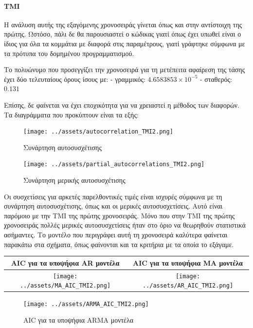\documentclass[11pt,]{article}
\let\oldparagraph\paragraph
\renewcommand{\paragraph}[1]{\oldparagraph{#1}\mbox{}}
\begin{document}
\hypertarget{tmi-1}{%
\paragraph{TMI}\label{tmi-1}}

Η ανάλυση αυτής της εξαγόμενης χρονοσειράς γίνεται όπως και στην
αντίστοιχη της πρώτης. Ωστόσο, πάλι δε θα παρουσιαστεί ο κώδικας γιατί
όπως έχει υπωθεί είναι ο ίδιος για όλα τα κομμάτια με διαφορά στις
παραμέτρους, γιατί γράφτηκε σύμφωνα με τα πρότυπα του δομημένου
προγραμματισμού.

Το πολυώνυμο που προσεγγίζει την χρονοσειρά για τη μετέπειτα αφαίρεση
της τάσης έχει δύο τελευταίους όρους ίσους με: - γραμμικός:
\(4.6583853\times 10^{-5}\) - σταθερός: \(0.131\)

Επίσης, δε φαίνεται να έχει εποχικότητα για να χρειαστεί η μέθοδος των
διαφορών. Τα διαγράμματα που προκύπτουν είναι τα εξής:

\begin{figure}
\centering
\texttt{[image: ../assets/autocorrelation\_TMI2.png]}
\caption{Συνάρτηση αυτοσυσχέτισης}
\end{figure}

\begin{figure}
\centering
\texttt{[image: ../assets/partial\_autocorrelations\_TMI2.png]}
\caption{Συνάρτηση μερικής αυτοσυσχέτισης}
\end{figure}

Οι συσχετίσεις για αρκετές παρελθοντικές τιμές είναι ισχυρές σύμφωνα με
τη συνάρτηση αυτοσυσχέτισης, όπως και οι μερικές αυτοσυσχετίσεις. Αυτό
είναι παρόμοιο με την TMI της πρώτης χρονοσειράς. Μόνο που στην TMI της
πρώτης χρονοσειράς πολλές μερικές αυτοσυσχετίσεις ήταν στο όριο να
θεωρηθούν στατιστικά ασήμαντες. Το μοντέλο που περιγράφει αυτή τη
χρονοσειρά καλύτερα φαίνεται παρακάτω στα σχήματα, όπως φαίνονται και τα
κριτήρια με τα οποία το εξάγαμε.

\begin{longtable}[]{@{}cc@{}}
\toprule
AIC για τα υποψήφια AR μοντέλα & AIC για τα υποψήφια MA
μοντέλα\tabularnewline
\midrule
\endhead
\texttt{[image: ../assets/MA\_AIC\_TMI2.png]}
&
\texttt{[image: ../assets/AR\_AIC\_TMI2.png]}\tabularnewline
\bottomrule
\end{longtable}

\begin{figure}
\centering
\texttt{[image: ../assets/ARMA\_AIC\_TMI2.png]}
\caption{AIC για τα υποψήφια ARMA μοντέλα}
\end{figure}
\end{document}
